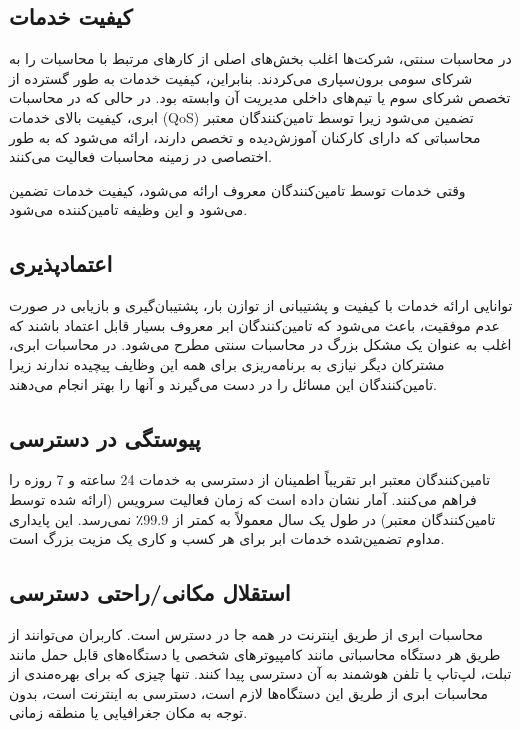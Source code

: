 \documentclass{book}
\begin{document}
    \subsection{کیفیت خدمات}

        در محاسبات سنتی، شرکت‌ها اغلب بخش‌های اصلی از کارهای مرتبط با محاسبات را به شرکای سومی برون‌سپاری می‌کردند. بنابراین، کیفیت خدمات به طور گسترده از تخصص شرکای سوم یا تیم‌های داخلی مدیریت آن وابسته بود. در حالی که در محاسبات ابری، کیفیت بالای خدمات (QoS) تضمین می‌شود زیرا توسط تامین‌کنندگان معتبر محاسباتی که دارای کارکنان آموزش‌دیده و تخصص دارند، ارائه می‌شود که به طور اختصاصی در زمینه محاسبات فعالیت می‌کنند.
    
    \begin{addinfo}
        
        وقتی خدمات توسط تامین‌کنندگان معروف ارائه می‌شود، کیفیت خدمات تضمین می‌شود و این وظیفه تامین‌کننده می‌شود.

    \end{addinfo}

    \subsection{اعتماد‌پذیری}

        توانایی ارائه خدمات با کیفیت و پشتیبانی از توازن بار، پشتیبان‌گیری و بازیابی در صورت عدم موفقیت، باعث می‌شود که تامین‌کنندگان ابر معروف بسیار قابل اعتماد باشند که اغلب به عنوان یک مشکل بزرگ در محاسبات سنتی مطرح می‌شود. در محاسبات ابری، مشترکان دیگر نیازی به برنامه‌ریزی برای همه این وظایف پیچیده ندارند زیرا تامین‌کنندگان این مسائل را در دست می‌گیرند و آنها را بهتر انجام می‌دهند.

    \subsection{پیوستگی در دسترسی}

        تامین‌کنندگان معتبر ابر تقریباً اطمینان از دسترسی به خدمات 24 ساعته و 7 روزه را فراهم می‌کنند. آمار نشان داده است که زمان فعالیت سرویس (ارائه شده توسط تامین‌کنندگان معتبر) در طول یک سال معمولاً به کمتر از 99.9٪ نمی‌رسد. این پایداری مداوم تضمین‌شده خدمات ابر برای هر کسب و کاری یک مزیت بزرگ است.

    \subsection{استقلال مکانی/راحتی دسترسی}

        محاسبات ابری از طریق اینترنت در همه جا در دسترس است. کاربران می‌توانند از طریق هر دستگاه محاسباتی مانند کامپیوترهای شخصی یا دستگاه‌های قابل حمل مانند تبلت، لپ‌تاپ یا تلفن هوشمند به آن دسترسی پیدا کنند. تنها چیزی که برای بهره‌مندی از محاسبات ابری از طریق این دستگاه‌ها لازم است، دسترسی به اینترنت است، بدون توجه به مکان جغرافیایی یا منطقه زمانی.
\end{document}

